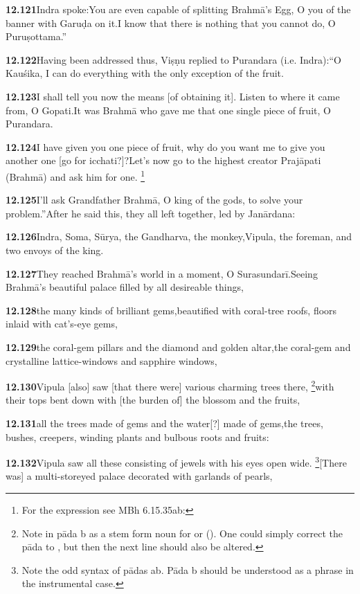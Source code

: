 \textbf{12.121}Indra spoke:You are even capable of splitting Brahmā's Egg, O you of the banner with Garuḍa on it.I know that there is nothing that you cannot do, O Puruṣottama.''%


\textbf{12.122}Having been addressed thus, Viṣṇu replied to Purandara (i.e. Indra):``O Kauśika, I can do everything with the only exception of the fruit.%


\textbf{12.123}I shall tell you now the means [of obtaining it]. Listen to where it came from, O Gopati.It was Brahmā who gave me that one single piece of fruit, O Purandara.%


\textbf{12.124}I have given you one piece of fruit, why do you want me to give you another one [go for icchati?]?Let's now go to the highest creator Prajāpati (Brahmā) and ask him for one.%
\footnote{For the expression  see MBh 6.15.35ab:                   }%


\textbf{12.125}I'll ask Grandfather Brahmā, O king of the gods, to solve your problem.''After he said this, they all left together, led by Janārdana:%


\textbf{12.126}Indra, Soma, Sūrya, the Gandharva, the monkey,Vipula, the foreman, and two envoys of the king.%


\textbf{12.127}They reached Brahmā's world in a moment, O Surasundarī.Seeing Brahmā's beautiful palace filled by all desireable things,%


\textbf{12.128}the many kinds of brilliant gems,beautified with coral-tree roofs, floors inlaid with cat's-eye gems,%


\textbf{12.129}the coral-gem pillars and the diamond and golden altar,the coral-gem and crystalline lattice-windows and sapphire windows,%


\textbf{12.130}Vipula [also] saw [that there were] various charming trees there,%
\footnote{Note  in pāda b as a stem form noun for  or                  (). One could simply correct the pāda to                 , but then the next line should also                 be altered.  }with their tops bent down with [the burden of] the blossom and the fruits,%


\textbf{12.131}all the trees made of gems and the water[?] made of gems,the trees, bushes, creepers, winding plants and bulbous roots and fruits:%


\textbf{12.132}Vipula saw all these consisting of jewels with his eyes open wide.%
\footnote{Note the odd syntax of pādas ab. Pāda b should be understood as a                  phrase in the instrumental case.  }[There was] a multi-storeyed palace decorated with garlands of pearls,%



